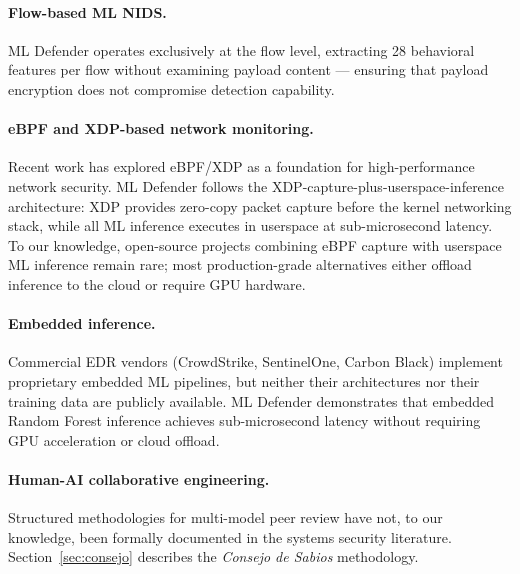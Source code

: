 \documentclass[11pt,a4paper]{article}
\begin{document}
    \paragraph{Flow-based ML NIDS.}
    ML Defender operates exclusively at the flow level, extracting 28 behavioral features per
    flow without examining payload content --- ensuring that payload encryption does not
    compromise detection capability.

    \paragraph{eBPF and XDP-based network monitoring.}
    Recent work has explored eBPF/XDP as a foundation for high-performance network security.
    ML Defender follows the XDP-capture-plus-userspace-inference architecture: XDP provides
    zero-copy packet capture before the kernel networking stack, while all ML inference executes
    in userspace at sub-microsecond latency. To our knowledge, open-source projects combining
    eBPF capture with userspace ML inference remain rare; most production-grade alternatives
    either offload inference to the cloud or require GPU hardware.

    \paragraph{Embedded inference.}
    Commercial EDR vendors (CrowdStrike, SentinelOne, Carbon Black) implement proprietary
    embedded ML pipelines, but neither their architectures nor their training data are publicly
    available. ML Defender demonstrates that embedded Random Forest inference achieves
    sub-microsecond latency without requiring GPU acceleration or cloud offload.

    \paragraph{Human-AI collaborative engineering.}
    Structured methodologies for multi-model peer review have not, to our knowledge, been
    formally documented in the systems security literature. Section~\ref{sec:consejo} describes
    the \emph{Consejo de Sabios} methodology.
\end{document}
